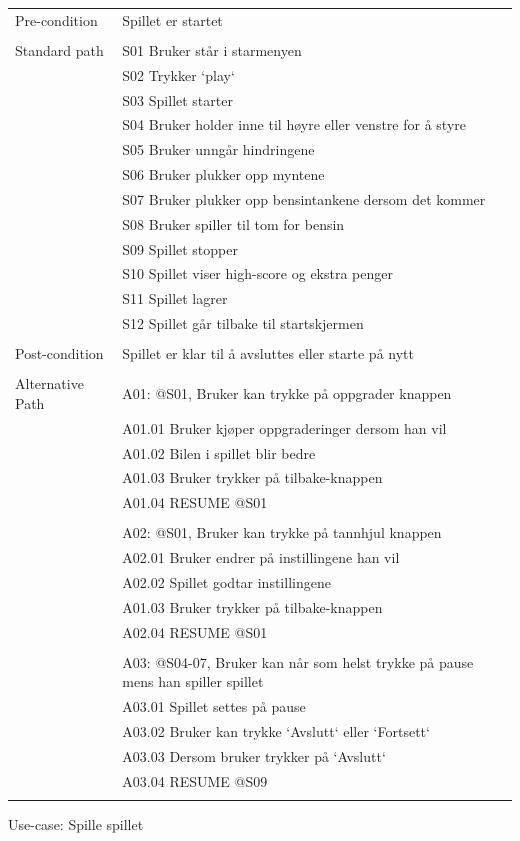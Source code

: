 \documentclass[paper=a4]{article}
\begin{document}
\begin{center}
\begin{tabular}{ | m{4cm} | m{10cm}|} 
\hline
Pre-condition & 
Spillet er startet \\&
\\ \hline

Standard path & 
S01 Bruker står i starmenyen \\&
S02 Trykker `play` \\&
S03 Spillet starter \\&
S04 Bruker holder inne til høyre eller venstre for å styre \\&
S05 Bruker unngår hindringene \\&
S06 Bruker plukker opp myntene\\&
S07 Bruker plukker opp bensintankene dersom det kommer\\&
S08 Bruker spiller til tom for bensin \\&
S09 Spillet stopper \\&
S10 Spillet viser high-score og ekstra penger \\&
S11 Spillet lagrer \\&
S12 Spillet går tilbake til startskjermen \\&
\\ \hline

Post-condition & 
Spillet er klar til å avsluttes eller starte på nytt \\&
\\ \hline

Alternative Path & 
A01: @S01, Bruker kan trykke på oppgrader knappen\\& 
		A01.01 Bruker kjøper oppgraderinger dersom han vil\\&
		A01.02 Bilen i spillet blir bedre \\&
		A01.03 Bruker trykker på tilbake-knappen \\&
		A01.04 RESUME @S01 \\&
		\\&
A02: @S01, Bruker kan trykke på tannhjul knappen\\& 
		A02.01 Bruker endrer på instillingene han vil\\&
		A02.02 Spillet godtar instillingene \\&
		A01.03 Bruker trykker på tilbake-knappen \\&
		A02.04 RESUME @S01 \\&
		\\&
A03: @S04-07, Bruker kan når som helst trykke på pause mens han spiller spillet\\&
		A03.01 Spillet settes på pause \\& 
		A03.02 Bruker kan trykke `Avslutt` eller `Fortsett`\\& 
		A03.03 Dersom bruker trykker på `Avslutt`\\& 
		A03.04 RESUME @S09 \\&
		
\\ \hline
\end{tabular}
Use-case: Spille spillet
\end{center}
\end{document}
